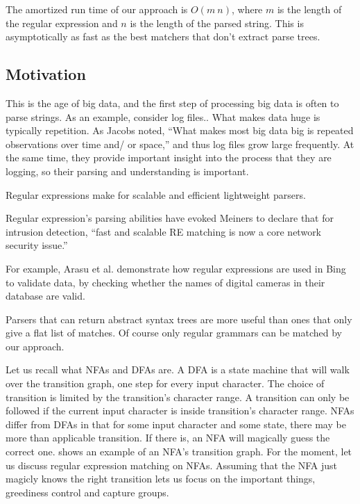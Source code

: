 \documentclass[english]{sigplanconf}
\begin{document}
The amortized run time of our approach is $O(m\: n)$, where $m$
is the length of the regular expression and $n$ is the length of
the parsed string. This is asymptotically as fast as the best matchers
that don't extract parse trees. 

\subsection{Motivation}

This is the age of big data, and the first step of processing big
data is often to parse strings. As an example, consider log files..
What makes data huge is typically repetition. As Jacobs\cite{Jacobs2009}
noted, ``What makes most big data big is repeated observations over
time and/ or space,'' and thus log files grow large frequently. At
the same time, they provide important insight into the process that
they are logging, so their parsing and understanding is important. 

Regular expressions make for scalable and efficient lightweight parsers.\cite{Karttunen1996} 

Regular expression's parsing abilities have evoked Meiners to declare
that for intrusion detection, ``fast and scalable RE matching is
now a core network security issue.'' \cite{Meiners2010}

For example, Arasu et al.\cite{Arasu2012} demonstrate how regular
expressions are used in Bing to validate data, by checking whether
the names of digital cameras in their database are valid.

Parsers that can return abstract syntax trees are more useful than
ones that only give a flat list of matches. Of course only regular
grammars can be matched by our approach.

Let us recall what NFAs and DFAs are. A DFA is a state machine that
will walk over the transition graph, one step for every input
character. The choice of transition is limited by the transition's
character range. A transition can only be followed if the current
input character is inside transition's character range. NFAs differ
from DFAs in that for some input character and some state, there may
be more than applicable transition. If there is, an NFA will magically
guess the correct one.  shows an example of
an NFA's transition graph. For the moment, let us discuss regular
expression matching on NFAs. Assuming that the NFA just magicly knows
the right transition lets us focus on the important things, greediness control
and capture groups.
\end{document}
